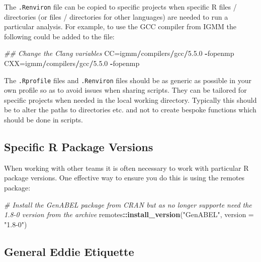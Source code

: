 \documentclass[]{book}
\newenvironment{Shaded}{\begin{snugshade}}{\end{snugshade}}
\newcommand{\CommentTok}[1]{\textcolor[rgb]{0.56,0.35,0.01}{\textit{#1}}}
\newcommand{\DataTypeTok}[1]{\textcolor[rgb]{0.13,0.29,0.53}{#1}}
\newcommand{\DecValTok}[1]{\textcolor[rgb]{0.00,0.00,0.81}{#1}}
\newcommand{\FloatTok}[1]{\textcolor[rgb]{0.00,0.00,0.81}{#1}}
\newcommand{\KeywordTok}[1]{\textcolor[rgb]{0.13,0.29,0.53}{\textbf{#1}}}
\newcommand{\NormalTok}[1]{#1}
\newcommand{\OperatorTok}[1]{\textcolor[rgb]{0.81,0.36,0.00}{\textbf{#1}}}
\newcommand{\StringTok}[1]{\textcolor[rgb]{0.31,0.60,0.02}{#1}}
\begin{document}
The \texttt{.Renviron} file can be copied to specific projects when specific R files / directories (or files / directories for other languages) are needed to run a particular analysis. For example, to use the GCC compiler from IGMM the following could be added to the file:

\begin{Shaded}
\begin{Highlighting}[]
\CommentTok{## Change the Clang variables}
\NormalTok{CC=igmm}\OperatorTok{/}\NormalTok{compilers}\OperatorTok{/}\NormalTok{gcc}\OperatorTok{/}\DecValTok{5}\NormalTok{.}\FloatTok{5.0} \OperatorTok{-}\NormalTok{fopenmp}
\NormalTok{CXX=igmm}\OperatorTok{/}\NormalTok{compilers}\OperatorTok{/}\NormalTok{gcc}\OperatorTok{/}\DecValTok{5}\NormalTok{.}\FloatTok{5.0} \OperatorTok{-}\NormalTok{fopenmp}
\end{Highlighting}
\end{Shaded}

The \texttt{.Rprofile} files and \texttt{.Renviron} files should be as generic as possible in your own profile so as to avoid issues when sharing scripts. They can be tailored for specific projects when needed in the local working directory. Typically this should be to alter the paths to directories etc. and not to create bespoke functions which should be done in scripts.

\hypertarget{specific-r-package-versions}{%
\subsection{Specific R Package Versions}\label{specific-r-package-versions}}

When working with other teams it is often necessary to work with particular R package versions. One effective way to ensure you do this is using the remotes package:

\begin{Shaded}
\begin{Highlighting}[]
\CommentTok{# Install the GenABEL package from CRAN but as no longer supporte need the 1.8-0 version from the archive}
\NormalTok{remotes}\OperatorTok{::}\KeywordTok{install_version}\NormalTok{(}\StringTok{"GenABEL"}\NormalTok{, }\DataTypeTok{version =} \StringTok{"1.8-0"}\NormalTok{)}
\end{Highlighting}
\end{Shaded}

\hypertarget{general-eddie-etiquette}{%
\subsection{General Eddie Etiquette}\label{general-eddie-etiquette}}
\end{document}
